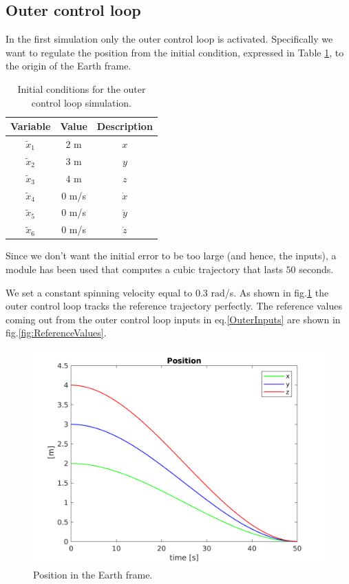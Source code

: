 \documentclass[11pt,a4paper]{scrartcl}
\begin{document}
\subsection*{Outer control loop}

In the first simulation only the outer control loop is activated. Specifically we want to regulate the position from the initial condition, expressed in Table \ref{InitCondOuter}, to the origin of the Earth frame.

\begin{table}[H]
	\centering
	\begin{tabular}{c c c}
		\toprule
		Variable & Value & Description \\
		\midrule 
		$\tilde{x}_1$  & $ 2 $ m & $x$ \\
		$\tilde{x}_2$  & $3$ m & $y$ \\
		$\tilde{x}_3$  & $4$ m & $z$ \\
		$\tilde{x}_4$  & $0$ m/s & $\dot{x}$ \\
		$\tilde{x}_5$  & $0$ m/s & $\dot{y}$ \\
		$\tilde{x}_6$  & $0$ m/s & $\dot{z}$ \\
		\bottomrule
	\end{tabular}
	\caption{Initial conditions for the outer control loop simulation.}
	\label{InitCondOuter}
\end{table}

Since we don't want the initial error to be too large (and hence, the inputs), a module has been used that computes a cubic trajectory that lasts $ 50 $ seconds.

We set a constant spinning velocity equal to $ 0.3 $ rad/s. As shown in fig.\ref{fig:outercontrolpos} the outer control loop tracks the reference trajectory perfectly. The reference values coming out from the outer control loop inputs in eq.\eqref{OuterInputs} are shown in fig.\ref{fig:ReferenceValues}.

\begin{figure}[H]
		\centering
		\includegraphics[width=0.6\linewidth]{Images/PositionOuter.png}
		\caption{Position in the Earth frame.}
		\label{fig:outercontrolpos}	
\end{figure} 
\end{document}
